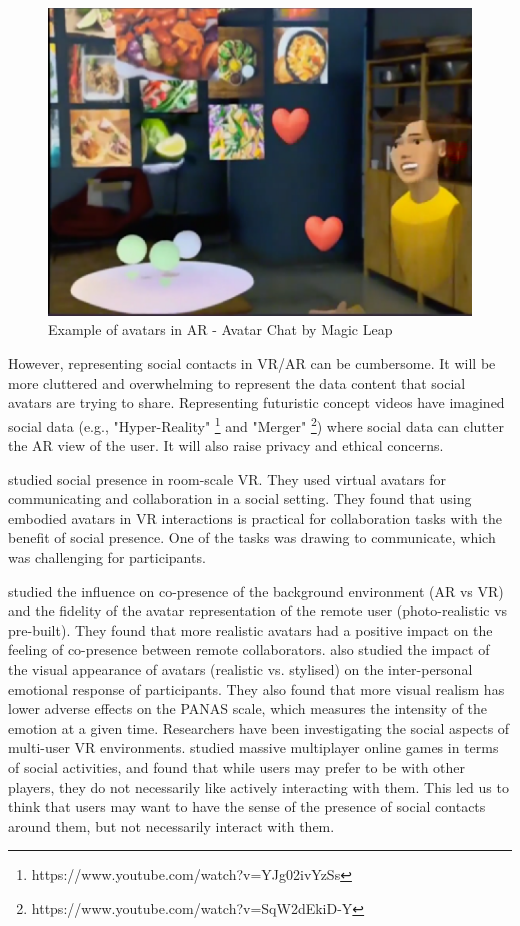 \begin{figure}
    \centering
    \includegraphics[width=0.8\linewidth]{images/20-background/avatar-chat-1.eps}
    \caption{Example of avatars in AR - Avatar Chat by Magic Leap}
    \label{fig:ml-avatar-chat-2}
\end{figure}

However, representing social contacts in VR/AR can be cumbersome. It will be more cluttered and overwhelming to represent the data content that social avatars are trying to share. Representing futuristic concept videos have imagined social data (e.g., "Hyper-Reality" \footnote{https://www.youtube.com/watch?v=YJg02ivYzSs} and "Merger" \footnote{https://www.youtube.com/watch?v=SqW2dEkiD-Y}) where social data can clutter the AR view of the user. It will also raise privacy and ethical concerns.

\textcite{Greenwald2017} studied social presence in room-scale VR. They used virtual avatars for communicating and collaboration in a social setting. They found that using embodied avatars in VR interactions is practical for collaboration tasks with the benefit of social presence. One of the tasks was drawing to communicate, which was challenging for participants. 

\textcite{Jo2016} studied the influence on co-presence of the background environment (AR vs VR) and the fidelity of the avatar representation of the remote user (photo-realistic vs pre-built). They found that more realistic avatars had a positive impact on the feeling of co-presence between remote collaborators. \textcite{Volante2016} also studied the impact of the visual appearance of avatars (realistic vs. stylised) on the inter-personal emotional response of participants. They also found that more visual realism has lower adverse effects on the PANAS scale, which measures the intensity of the emotion at a given time. Researchers have been investigating the social aspects of multi-user VR environments. \textcite{Ducheneaut2006} studied massive multiplayer online games in terms of social activities, and found that while users may prefer to be with other players, they do not necessarily like actively interacting with them. This led us to think that users may want to have the sense of the presence of social contacts around them, but not necessarily interact with them.


